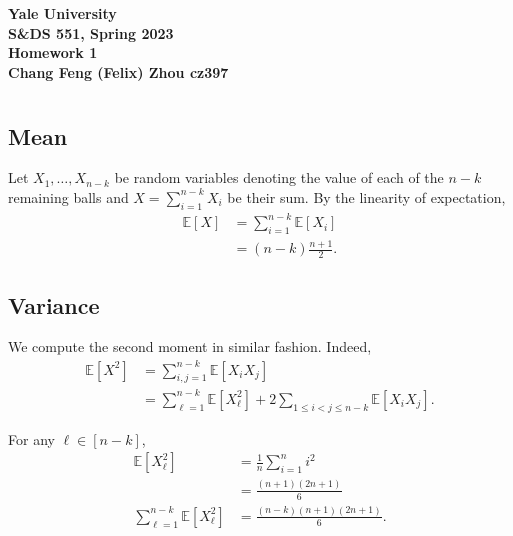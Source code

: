 \documentclass[10pt]{article}
\newcommand{\E}{\mathbb{E}}
\begin{document}
\begin{center}
    {\Large\textbf{Yale University}}\\
    \vspace{3mm}
    {\Large\textbf{S\&DS 551, Spring 2023}}\\
    \vspace{2mm}
    {\Large\textbf{Homework 1}}\\
    \vspace{3mm}
    \textbf{Chang Feng (Felix) Zhou cz397}
\end{center}

\section{}
\subsection{Mean}
Let $X_1, \dots, X_{n-k}$ be random variables denoting the value of each of the $n-k$ remaining balls
and $X = \sum_{i=1}^{n-k} X_i$ be their sum.
By the linearity of expectation,
\begin{align*}
  \E[X]
  &= \sum_{i=1}^{n-k} \E[X_i] \\
  &= \boxed{(n-k) \frac{n+1}2}.
\end{align*}

\subsection{Variance}
We compute the second moment in similar fashion.
Indeed,
\begin{align*}
  \E[X^2]
  &= \sum_{i, j=1}^{n-k} \E[X_iX_j] \\
  &= \sum_{\ell=1}^{n-k} \E[X_\ell^2] + 2 \sum_{1\leq i<j\leq n-k} \E[X_iX_j].
\end{align*}

For any $\ell\in [n-k]$,
\begin{align*}
  \E[X_\ell^2]
  &= \frac1n \sum_{i=1}^n i^2 \\
  &= \frac{(n+1)(2n+1)}6 \\
  \sum_{\ell=1}^{n-k} \E[X_\ell^2]
  &= \frac{(n-k)(n+1)(2n+1)}6.
\end{align*}
\end{document}

